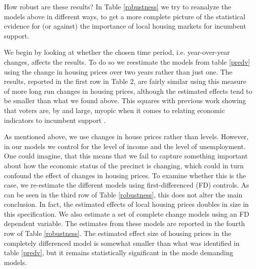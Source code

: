 \documentclass[12pt,a4paper]{article}
\begin{document}
	How robust are these results? In Table \ref{robustness} we try to reanalyze the models above in different ways, to get a more complete picture of the statistical evidence for (or against) the importance of local housing markets for incumbent support.
	
	
	
	
	We begin by looking at whether the chosen time period, i.e. year-over-year changes, affects the results. To do so we reestimate the models from table \ref{predv} using the change in housing prices over two years rather than just one. The results, reported in the first row in Table 2, are fairly similar using this measure of more long run changes in housing prices, although the estimated effects tend to be smaller than what we found above. This squares with previous work showing that voters are, by and large, myopic when it comes to relating economic indicators to incumbent support \citep{healy2009myopic,healy2014substituting}.
	
	As mentioned above, we use changes in house prices rather than levels. However, in our models we control for the level of income and the level of unemployment. One could imagine, that this means that we fail to capture something important about how the economic status of the precinct is changing, which could in turn confound the effect of changes in housing prices. To examine whether this is the case, we re-estimate the different models using first-differenced (FD) controls. As can be seen in the third row of Table \ref{robustness}, this does not alter the main conclusion. In fact, the estimated effects of local housing prices doubles in size in this specification. We also estimate a set of complete change models using an FD dependent variable. The estimates from these models are reported in the fourth row of Table \ref{robustness}. The estimated effect size of housing prices in the completely differenced model is somewhat smaller than what was identified in table \ref{predv}, but it remains statistically significant in the mode demanding models.
	
\end{document}
